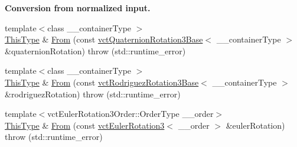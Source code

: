 \begin{Indent}{\bf Conversion from normalized input.}
\begin{DoxyCompactItemize}
\item 
{\footnotesize template$<$class \-\_\-\-\_\-container\-Type $>$ }\\\hyperlink{classvct_matrix_rotation3_base_a027be766cb10ca3c2ad8e85c28ed0af9}{This\-Type} \& \hyperlink{classvct_matrix_rotation3_base_ab20e8228478b7e9e06ba3f84da04697c}{From} (const \hyperlink{classvct_quaternion_rotation3_base}{vct\-Quaternion\-Rotation3\-Base}$<$ \-\_\-\-\_\-container\-Type $>$ \&quaternion\-Rotation)  throw (std\-::runtime\-\_\-error)
\item 
{\footnotesize template$<$class \-\_\-\-\_\-container\-Type $>$ }\\\hyperlink{classvct_matrix_rotation3_base_a027be766cb10ca3c2ad8e85c28ed0af9}{This\-Type} \& \hyperlink{classvct_matrix_rotation3_base_a2a38e298103d26375699b63a54762e9a}{From} (const \hyperlink{classvct_rodriguez_rotation3_base}{vct\-Rodriguez\-Rotation3\-Base}$<$ \-\_\-\-\_\-container\-Type $>$ \&rodriguez\-Rotation)  throw (std\-::runtime\-\_\-error)
\item 
{\footnotesize template$<$vct\-Euler\-Rotation3\-Order\-::\-Order\-Type \-\_\-\-\_\-order$>$ }\\\hyperlink{classvct_matrix_rotation3_base_a027be766cb10ca3c2ad8e85c28ed0af9}{This\-Type} \& \hyperlink{classvct_matrix_rotation3_base_a50d343bc1b91fcf9c736d3b652a9f39a}{From} (const \hyperlink{classvct_euler_rotation3}{vct\-Euler\-Rotation3}$<$ \-\_\-\-\_\-order $>$ \&euler\-Rotation)  throw (std\-::runtime\-\_\-error)
\end{DoxyCompactItemize}
\end{Indent}

